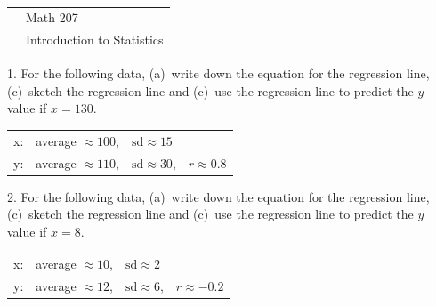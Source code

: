 \documentclass[10pt]{article}
\begin{document}
{\small{\ }\hfill
\begin{tabular}{cl}
& Math 207\\& Introduction to Statistics\\
\end{tabular}
}
\vspace{.3in}

1. For the following data, (a)~write down the equation for the regression line, 
(c)~sketch the regression line and (c)~use the regression line to predict the $y$ value
if $x=130$.\vspace{-8pt}
\begin{center}
\begin{tabular}{llll}
x: & average $\approx 100$, & $\mbox{sd}\approx 15$\\
y: & average $\approx 110$, & $\mbox{sd}\approx 30$,  & $r\approx 0.8$\\
\end{tabular}
\end{center}
\vspace{1.25in}

2. For the following data, (a)~write down the equation for the regression line, 
(c)~sketch the regression line and (c)~use the regression line to predict the $y$ value
if $x=8$.\vspace{-8pt}
\begin{center}
\begin{tabular}{llll}
x: & average $\approx 10$, & $\mbox{sd}\approx 2$\\
y: & average $\approx 12$, & $\mbox{sd}\approx 6$,  & $r\approx -0.2$\\
\end{tabular}
\end{center}
\vfill
\eject
{\ }
\end{document}
